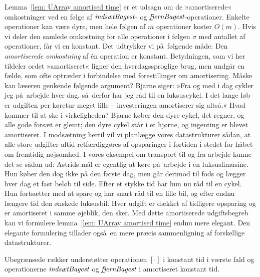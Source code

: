Lemma~\ref{lem: UArray amortised time} er et udsagn om de »amortiserede« omkostninger ved en følge af $\operatorname{\emph{indsætBagest}}$- og $\operatorname{\emph{fjernBagest}}$-operationer.
Enkelte operationer kan være dyre, men hele følgen af $m$ operationer koster $O(m)$.
Hvis vi deler den samlede omkostning for alle operationer i følgen $\sigma$  med antallet af operationer, får vi en konstant.
Det udtrykker vi på følgende måde:
Den \emph{amortiserede omkostning} af én operation er konstant.
Betydningen, som vi her tildeler ordet »amortiseret« ligner den hverdagssproglige brug, men undgår en fælde, som ofte optræder i forbindelse med forestillinger om amortisering.
Måske kan læseren genkende følgende argument?
Bjarne siger: »Fra og med i dag cykler jeg på arbejde hver dag, så derfor har jeg råd til en luksuscykel.
I det lange løb er udgiften per køretur meget lille -- investeringen amortiserer sig altså.«
Hvad kommer til at ske i virkeligheden?
Bjarne køber den dyre cykel, det regner, og alle gode forsæt er glemt; den dyre cykel står i et hjørne, og ingenting er blevet amortiseret.
I modsætning hertil vil vi planlægge vores datastrukturer sådan, at alle store udgifter altid retfærdiggøres af opsparinger i fortiden i stedet for håbet om fremtidig nøjsomhed.
I vores eksempel om transport til og fra arbejde kunne det se sådan ud:
Astrids mål er egentlig at køre på arbejde i en luksuslimusine.
Hun køber den dog ikke på den første dag, men går derimod til fods og lægger hver dag et fast beløb til side.
Efter et stykke tid har hun nu råd til en cykel.
Hun fortsætter med at spare og har snart råd til en lille bil, og efter endnu længere tid den ønskede luksusbil.
Hver udgift er dækket af tidligere opsparing og er amortiseret i samme øjeblik, den sker.
Med dette amortiserede udgiftsbegreb kan vi formulere lemma~\ref{lem: UArray amortised time} endnu mere elegant.
Den elegante formulering tillader også en mere præcis sammenligning af forskellige datastrukturer.

\begin{cor}
  Ubegrænsede rækker understøtter operationen $[\cdot]$ i konstant tid i værste fald og operationerne $\operatorname{\emph{indsætBagest}}$ og $\operatorname{\emph{fjernBagest}}$ i amortiseret konstant tid.
\end{cor}

